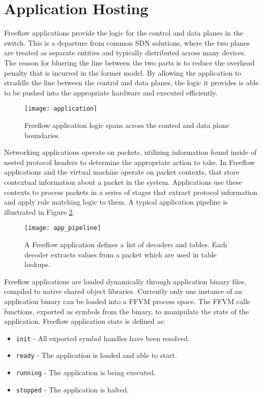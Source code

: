 \section{Application Hosting}
\label{ff:app}
Freeflow applications provide the logic for the control and data planes in the
switch. This is a departure from common SDN solutions, where the two planes are
treated as separate entities and typically distributed across many devices.
The reason for blurring the line between the two parts is to reduce the overhead
penalty that is incurred in the former model. By allowing the application to
straddle the line between the control and data planes, the logic it provides is
able to be pushed into the appropriate hardware and executed efficiently.

\begin{figure}[h]
\centering
\texttt{[image: application]}
\caption{Freeflow application logic spans across the control and data plane
boundaries.}
\label{app}
\end{figure}

Networking applications operate on packets, utilizing information found inside
of nested protocol headers to determine the appropriate action to take. In
Freeflow applications and the virtual machine operate on packet contexts,
that store contextual information about a packet in the system. Applications
use these contexts to process packets in a series of stages that extract
protocol information and apply rule matching logic to them. A typical
application pipeline is illustrated in Figure \ref{app_pipeline}.

\begin{figure}[h]
\centering
\texttt{[image: app\_pipeline]}
\caption{A Freeflow application defines a list of decoders and tables.
Each decoder extracts values from a packet which are used in table lookups.}
\label{app_pipeline}
\end{figure}

Freeflow applications are loaded dynamically through application binary
files, compiled to native shared object libraries. Currently only one instance
of an application binary can be loaded into a FFVM process space. The FFVM
calls functions, exported as symbols from the binary, to manipulate the state
of the application. Freeflow application state is defined as:

\begin{itemize}
  \item \texttt{init} - All exported symbol handles have been resolved.
  \item \texttt{ready} - The application is loaded and able to start.
  \item \texttt{running} - The application is being executed.
  \item \texttt{stopped} - The application is halted.
\end{itemize}

